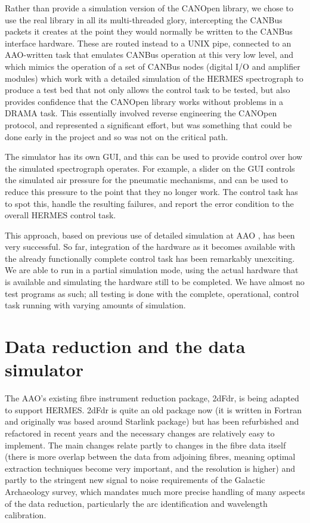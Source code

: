 Rather than provide a simulation version of the CANOpen library, we chose to use the real library in all its multi-threaded glory, intercepting the CANBus packets it creates at the point they would normally be written to the CANBus interface hardware. These are routed instead to a UNIX pipe, connected to an AAO-written task that emulates CANBus operation at this very low level, and which mimics the operation of a set of CANBus nodes (digital I/O and amplifier modules) which work with a detailed simulation of the HERMES spectrograph to produce a test bed that not only allows the control task to be tested, but also provides confidence that the CANOpen library works without problems in a DRAMA task. This essentially involved reverse engineering the CANOpen protocol, and represented a significant effort, but was something that could be done early in the project and so was not on the critical path.

The simulator has its own GUI, and this can be used to provide control over how the simulated spectrograph operates. For example, a slider on the GUI controls the simulated air pressure for the pneumatic mechanisms, and can be used to reduce this pressure to the point that they no longer work. The control task has to spot this, handle the resulting failures, and report the error condition to the overall HERMES control task.

This approach, based on previous use of detailed simulation at AAO \citep{TCS_2010}, has been very successful. So far, integration of the hardware as it becomes available with the already functionally complete control task has been remarkably unexciting. We are able to run in a partial simulation mode, using the actual hardware that is available and simulating the hardware still to be completed. We have almost no test programs as such; all testing is done with the complete, operational, control task running with varying amounts of simulation.

\section{Data reduction and the data simulator}

The AAO's existing fibre instrument reduction package, 2dFdr, is being adapted to support HERMES. 2dFdr is quite an old package now (it is written in Fortran and originally was based around Starlink package) but has been refurbished and refactored in recent years and the necessary changes are relatively easy to implement. The main changes relate partly to changes in the fibre data itself (there is more overlap between the data from adjoining fibres, meaning optimal extraction techniques become very important, and the resolution is higher) and partly to the stringent new signal to noise requirements of the Galactic Archaeology survey, which mandates much more precise handling of many aspects of the data reduction, particularly the arc identification and wavelength calibration.

